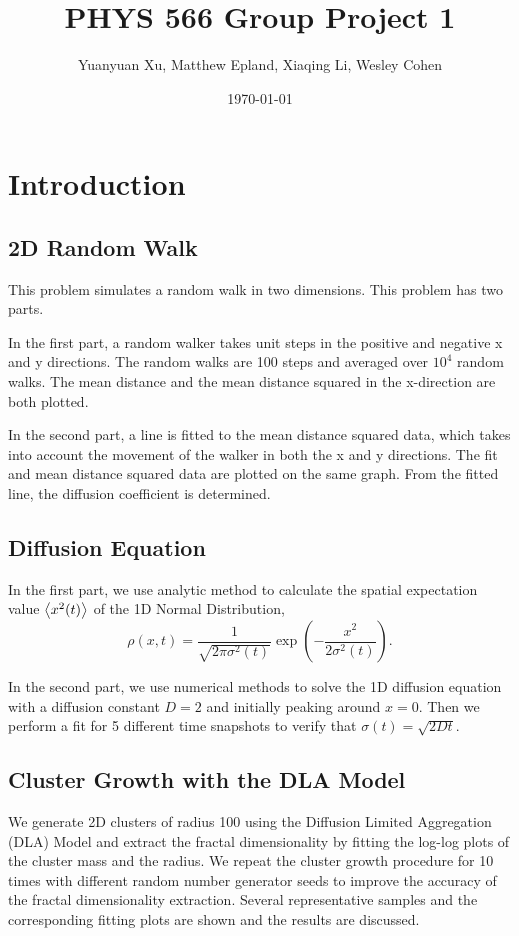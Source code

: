 \documentclass[notitlepage,aps,prd,nofootinbib]{revtex4-1}
\begin{document}
\title{PHYS 566 Group Project 1}
\author{Yuanyuan Xu, Matthew Epland, Xiaqing Li, Wesley Cohen}

\date{\today}

\maketitle

\section{Introduction}
\label{sec:intro}
\subsection{2D Random Walk}
This problem simulates a random walk in two dimensions. This problem has two parts. 

In the first part, a random walker takes unit steps in the positive and negative x and y directions. The random walks are 100 steps and averaged over $10^4$ random walks. The mean distance and the mean distance squared in the x-direction are both plotted. 

In the second part, a line is fitted to the mean distance squared data, which takes into account the movement of the walker in both the x and y directions. The fit and mean distance squared data are plotted on the same graph. From the fitted line, the diffusion coefficient is determined.

\subsection{Diffusion Equation}
In the first part, we use analytic method to calculate the spatial expectation value $\expval{x^{2}(t)}$ of the 1D Normal Distribution,
\begin{equation}
	\rho(x,t) = \frac{1}{\sqrt{2\pi\sigma^{2}(t)}}\exp(-\frac{x^{2}}{2\sigma^{2}(t)}).
\end{equation}

In the second part, we use numerical methods to solve the 1D diffusion equation with a diffusion constant $D = 2$ and initially peaking around $x = 0$. Then we perform a fit for 5 different time snapshots to verify that $\sigma(t) = \sqrt{2Dt}$.

\subsection{Cluster Growth with the DLA Model}
We generate 2D clusters of radius 100 using the Diffusion Limited Aggregation (DLA) Model and extract the fractal dimensionality by fitting the log-log plots of the cluster mass and the radius. We repeat the cluster growth procedure for 10 times with different random number generator seeds to improve the accuracy of the fractal dimensionality extraction. Several representative samples and the corresponding fitting plots are shown and the results are discussed. 
\end{document}
